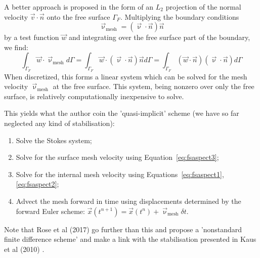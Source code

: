 A better approach is proposed in the form of an $L_2$ projection of the 
normal velocity $\vec{v}\cdot\vec{n}$ onto the free surface $\Gamma_F$. 
Multiplying the boundary conditions 
\[
\vec{\upnu}_{\text{mesh}} = (\vec{\upnu}\cdot\vec{n})\vec{n} 
\]
by a test function $\vec{w}$ and integrating over the free surface part of the boundary, we find:
\begin{equation}
\int_{\Gamma_F} \vec{w}\cdot\vec{\upnu}_{\text{mesh}} d\Gamma 
=
\int_{\Gamma_F} \vec{w}\cdot (\vec{\upnu}\cdot\vec{n})\vec{n} d\Gamma
=
\int_{\Gamma_F} (\vec{w}\cdot\vec{n}) (\vec{\upnu}\cdot\vec{n}) d\Gamma \label{eq:fsaspect3}
\end{equation}
When discretized, this forms a linear system which can be
solved for the mesh velocity $\vec{\upnu}_{\text{mesh}}$ 
at the free surface. 
This system, being nonzero over only the
free surface, is relatively computationally inexpensive to solve.

This yields what the author coin the 'quasi-implicit' scheme 
(we have so far neglected any kind of stabilisation):
\begin{enumerate}
\item Solve the Stokes system;
\item Solve for the surface mesh velocity using Equation~\ref{eq:fsaspect3};
\item Solve for the internal mesh velocity using Equations~\ref{eq:fsaspect1}, \ref{eq:fsaspect2}; 
\item Advect the mesh forward in time using displacements determined by
the forward Euler scheme: $\vec{x}(t^{n+1} ) = \vec{x}(t^n ) + \vec{\upnu}_{\text{mesh}} \delta t$.
\end{enumerate}

Note that Rose et al (2017) \cite{robh17} go further than this and propose a 'nonstandard finite difference scheme' and make a link with the stabilisation presented in Kaus et al (2010) \cite{kamm10}.

